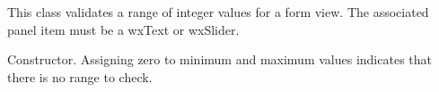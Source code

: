 \section{}\label{wxintegerformvalidator}


This class validates a range of integer values for a form view. The associated panel item must be a wxText
or wxSlider.



Constructor. Assigning zero to minimum and maximum values indicates that there is no range to check.


